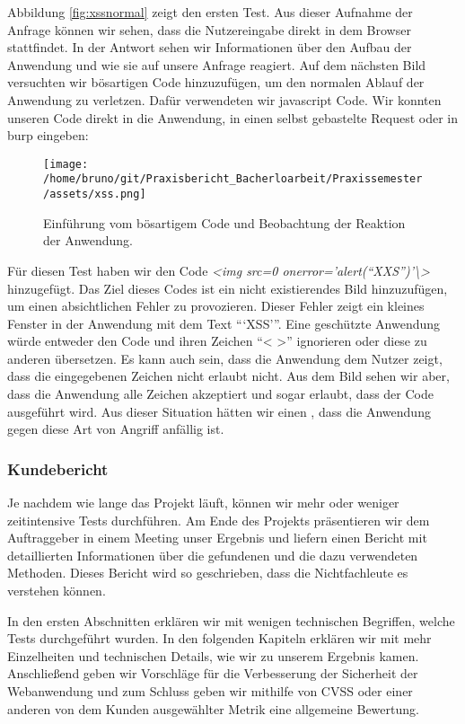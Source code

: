 Abbildung \ref{fig:xssnormal} zeigt den ersten Test. Aus dieser Aufnahme der Anfrage können wir sehen, dass die Nutzereingabe direkt in dem Browser stattfindet. In der Antwort sehen wir Informationen über den Aufbau der Anwendung und wie sie auf unsere Anfrage reagiert. Auf dem nächsten Bild versuchten wir bösartigen Code hinzuzufügen, um den normalen Ablauf der Anwendung zu verletzen. Dafür verwendeten wir \gls{javascript} Code. Wir konnten unseren Code direkt in die Anwendung, in einen selbst gebastelte Request oder in \gls{burp} eingeben:

\begin{figure}[H]
    \centering
    \texttt{[image: /home/bruno/git/Praxisbericht\_Bacherloarbeit/Praxissemester/assets/xss.png]}
    \caption{Einführung vom bösartigem Code und Beobachtung der Reaktion der Anwendung.}
    \label{fig:xssexecuted}
    \centering
\end{figure}

Für diesen Test haben wir den Code \textit{<img src=0 onerror='alert(``XXS'')'\textbackslash>} hinzugefügt. Das Ziel dieses Codes ist ein nicht existierendes Bild hinzuzufügen, um einen absichtlichen Fehler zu provozieren. Dieser Fehler zeigt ein kleines Fenster in der Anwendung mit dem Text ```XSS'''. Eine geschützte Anwendung würde entweder den Code und ihren Zeichen ``< >'' ignorieren oder diese zu anderen übersetzen. Es kann auch sein, dass die Anwendung dem Nutzer zeigt, dass die eingegebenen Zeichen nicht erlaubt nicht. Aus dem Bild sehen wir aber, dass die Anwendung alle Zeichen akzeptiert und sogar erlaubt, dass der Code ausgeführt wird. Aus dieser Situation hätten wir einen , dass die Anwendung gegen diese Art von Angriff anfällig ist.


\subsubsection{Kundebericht}

Je nachdem wie lange das Projekt läuft, können wir mehr oder weniger zeitintensive Tests durchführen. Am Ende des Projekts präsentieren wir dem Auftraggeber in einem Meeting unser Ergebnis und liefern einen Bericht mit detaillierten Informationen über die gefundenen  und die dazu verwendeten Methoden. Dieses Bericht wird so geschrieben, dass die Nichtfachleute es verstehen können. 

In den ersten Abschnitten erklären wir mit wenigen technischen Begriffen, welche Tests durchgeführt wurden. In den folgenden Kapiteln erklären wir mit mehr Einzelheiten und technischen Details, wie wir zu unserem Ergebnis kamen. Anschließend geben wir Vorschläge für die Verbesserung der Sicherheit der Webanwendung und zum Schluss geben wir mithilfe von \gls{CVSS} oder einer anderen von dem Kunden ausgewählter Metrik eine allgemeine Bewertung.
